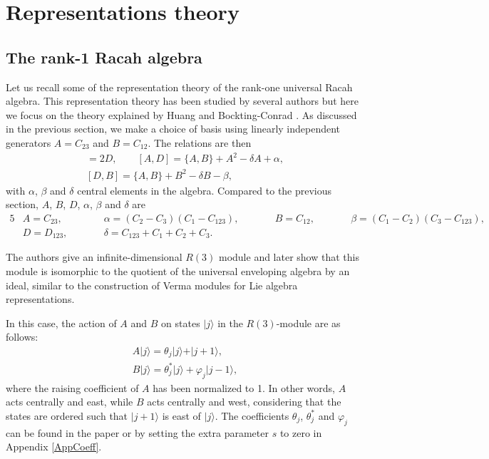 \documentclass[pdftex]{sigma}
\numberwithin{equation}{section}
\begin{document}
\section{Representations theory}
\label{repn}
\subsection{The rank-1 Racah algebra}\label{rankone}
Let us recall some of the representation theory of the rank-one universal Racah algebra. This representation theory has been studied by several authors but here we focus on the theory explained by Huang and Bockting-Conrad \cite{HBC2020}. As discussed in the previous section, we make a choice of basis using linearly independent generators $A=C_{23}$ and $B=C_{12}$. The relations are then
\begin{gather}%
[A,B]=2D,\qquad
[A,D]= \lbrace A,B\rbrace+A^2-\delta A +\alpha,\label{Pres11}\\
[D,B]=\lbrace A,B\rbrace+B^2-\delta B -\beta,\label{Pres13}
\end{gather}
with $\alpha$, $\beta$ and $\delta$ central elements in the algebra. Compared to the previous section, $A$, $B$, $D$, $\alpha$, $\beta$ and $\delta$ are
\begin{alignat*}{5}
&A=C_{23},\qquad&& \alpha=(C_2-C_3)(C_1-C_{123}),\qquad&&
B=C_{12}, \qquad&& \beta=(C_1-C_2)(C_3-C_{123}),&\\
&D=D_{123},\qquad&&\delta=C_{123}+C_1+C_2+C_3.&&&&&
\end{alignat*}

The authors give an infinite-dimensional $R(3)$ module \cite[Proposition~3.1]{HBC2020} and later show that this module is isomorphic to the quotient of the universal enveloping algebra by an ideal, similar to the construction of Verma modules for Lie algebra representations.


In this case, the action of $A$ and $B$ on states $\vert j\rangle$ in the $R(3)$-module are as follows:
\begin{gather}
A\vert j\rangle=\theta_j\vert j\rangle+\vert j+1\rangle,\label{actionA}\\
B\vert j\rangle=\theta^*_j\vert j\rangle+\varphi_j\vert j-1\rangle,\label{actionB}
\end{gather}
where the raising coefficient of $A$ has been normalized to 1. In other words, $A$ acts centrally and east, while $B$ acts centrally and west, considering that the states are ordered such that $\vert j+1\rangle$ is east of $\vert j\rangle$. The coefficients $\theta_j$, $\theta_j^*$ and $\varphi_j$ can be found in the paper \cite{HBC2020} or by setting the extra parameter $s$ to zero in Appendix \ref{AppCoeff}.
\end{document}
